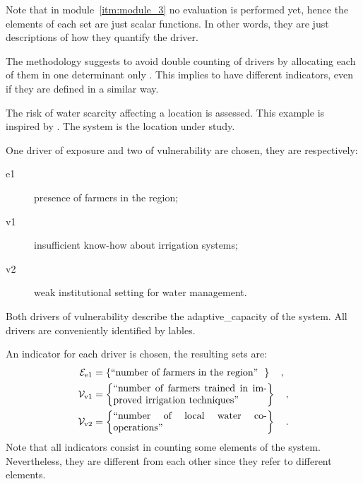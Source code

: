 Note that in module~\ref{itm:module_3} no evaluation is performed yet, hence the elements of each set are just scalar functions. In other words, they are just descriptions of how they quantify the \gls{driver}.

The methodology suggests to avoid double counting of \glspl{driver} by allocating each of them in one \gls{determinant} only \cite[29]{2017GIZRiskSupplement}. This implies to have different \glspl{indicator}, even if they are defined in a similar way.
\begin{example}
  The risk of water scarcity affecting a location is assessed. This example is inspired by \cite[46]{2017GIZRiskSupplement}. The system is the location under study.
  
  One \gls{driver} of \gls{exposure} and two of \gls{vulnerability} are chosen, they are respectively:
  \begin{description}
    \item[e1] presence of farmers in the region;
    \item[v1] insufficient know-how about irrigation systems;
    \item[v2] weak institutional setting for water management.
  \end{description}
  Both \glspl{driver} of \gls{vulnerability} describe the \gls{adaptive_capacity} of the system. All \glspl{driver} are conveniently identified by lables.
  
  An \gls{indicator} for each \gls{driver} is chosen, the resulting sets are:
  \begin{align*}
    \mathcal{E}_\text{e1} & = \left\{ \parbox{0.45\linewidth}{``number of farmers in the region''} \right\}
    \quad , \\
    \mathcal{V}_\text{v1} & = \left\{ \parbox{0.45\linewidth}{``number of farmers trained in improved irrigation techniques''} \right\}
    \quad , \\
    \mathcal{V}_\text{v2} & = \left\{ \parbox{0.45\linewidth}{``number of local water co-operations''} \right\}
    \quad .
  \end{align*}
  Note that all \glspl{indicator} consist in counting some elements of the system. Nevertheless, they are different from each other since they refer to different elements.
\end{example}

